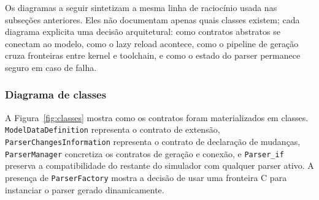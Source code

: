 \documentclass[12pt,a4paper]{article}
\begin{document}
Os diagramas a seguir sintetizam a mesma linha de racioc\'inio usada nas subse\c{c}\~oes anteriores. Eles n\~ao documentam apenas quais classes existem; cada diagrama explicita uma decis\~ao arquitetural: como contratos abstratos se conectam ao modelo, como o lazy reload acontece, como o pipeline de gera\c{c}\~ao cruza fronteiras entre kernel e toolchain, e como o estado do parser permanece seguro em caso de falha.

\subsubsection{Diagrama de classes}

A Figura~\ref{fig:classes} mostra como os contratos foram materializados em classes. \texttt{ModelDataDefinition} representa o contrato de extens\~ao, \texttt{ParserChangesInformation} representa o contrato de declara\c{c}\~ao de mudan\c{c}as, \texttt{ParserManager} concretiza os contratos de gera\c{c}\~ao e conex\~ao, e \texttt{Parser\_if} preserva a compatibilidade do restante do simulador com qualquer parser ativo. A presen\c{c}a de \texttt{ParserFactory} mostra a decis\~ao de usar uma fronteira C para instanciar o parser gerado dinamicamente.
\end{document}
